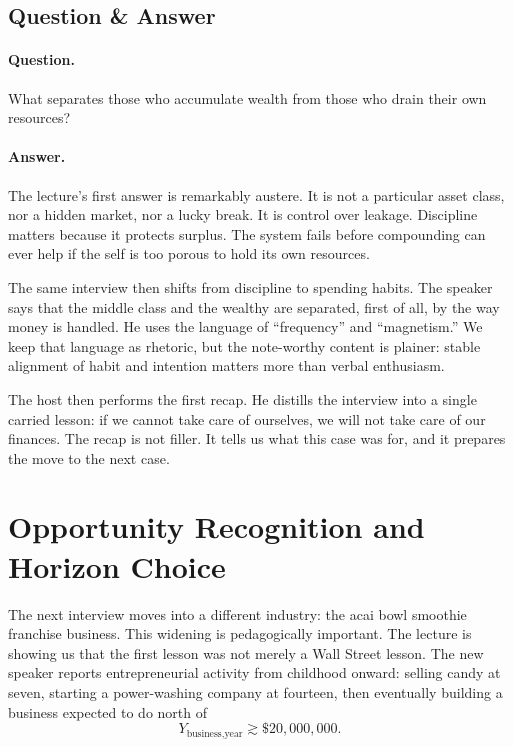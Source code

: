 \subsection{Question \& Answer}

\paragraph{Question.} What separates those who accumulate wealth from those who drain their own resources?

\paragraph{Answer.} The lecture's first answer is remarkably austere. It is not a particular asset class, nor a hidden market, nor a lucky break. It is control over leakage. Discipline matters because it protects surplus. The system fails before compounding can ever help if the self is too porous to hold its own resources.

The same interview then shifts from discipline to spending habits. The speaker says that the middle class and the wealthy are separated, first of all, by the way money is handled. He uses the language of ``frequency'' and ``magnetism.'' We keep that language as rhetoric, but the note-worthy content is plainer: stable alignment of habit and intention matters more than verbal enthusiasm.

The host then performs the first recap. He distills the interview into a single carried lesson: if we cannot take care of ourselves, we will not take care of our finances. The recap is not filler. It tells us what this case was for, and it prepares the move to the next case.

\section{Opportunity Recognition and Horizon Choice}

The next interview moves into a different industry: the acai bowl smoothie franchise business. This widening is pedagogically important. The lecture is showing us that the first lesson was not merely a Wall Street lesson. The new speaker reports entrepreneurial activity from childhood onward: selling candy at seven, starting a power-washing company at fourteen, then eventually building a business expected to do north of
\begin{equation}
Y_{\text{business,year}} \gtrsim \$20{,}000{,}000.
\end{equation}

